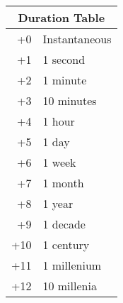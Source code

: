 \begin{tabularx}{\marginparwidth}{rX}
\multicolumn{2}{c}{Duration Table} \\
\hline
+0 & Instantaneous \\
+1 & 1 second \\
+2 & 1 minute \\
+3 & 10 minutes \\
+4 & 1 hour \\
+5 & 1 day \\
+6 & 1 week \\
+7 & 1 month \\
+8 & 1 year \\
+9 & 1 decade \\
+10 & 1 century \\
+11 & 1 millenium \\
+12 & 10 millenia \\
\end{tabularx}